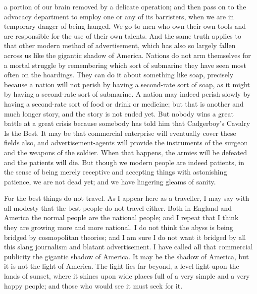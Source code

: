 \documentclass{book}
\begin{document}
a portion of our brain removed by a delicate operation; and then pass on to the advocacy department to employ one or any of its barristers, when we are in temporary danger of being hanged. We go to men who own their own tools and are responsible for the use of their own talents. And the same truth applies to that other modern method of advertisement, which has also so largely fallen across us like the gigantic shadow of America. Nations do not arm themselves for a mortal struggle by remembering which sort of submarine they have seen most often on the hoardings. They can do it about something like soap, precisely because a nation will not perish by having a second-rate sort of soap, as it might by having a second-rate sort of submarine. A nation may indeed perish slowly by having a second-rate sort of food or drink or medicine; but that is another and much longer story, and the story is not ended yet. But nobody wins a great battle at a great crisis because somebody has told him that Cadgerboy’s Cavalry Is the Best. It may be that commercial enterprise will eventually cover these fields also, and advertisement-agents will provide the instruments of the surgeon and the weapons of the soldier. When that happens, the armies will be defeated and the patients will die. But though we modern people are indeed patients, in the sense of being merely receptive and accepting things with astonishing patience, we are not dead yet; and we have lingering gleams of sanity.

For the best things do not travel. As I appear here as a traveller, I may say with all modesty that the best people do not travel either. Both in England and America the normal people are the national people; and I repeat that I think they are growing more and more national. I do not think the abyss is being bridged by cosmopolitan theories; and I am sure I do not want it bridged by all this slang journalism and blatant advertisement. I have called all that commercial publicity the gigantic shadow of America. It may be the shadow of America, but it is not the light of America. The light lies far beyond, a level light upon the lands of sunset, where it shines upon wide places full of a very simple and a very happy people; and those who would see it must seek for it.
\end{document}
